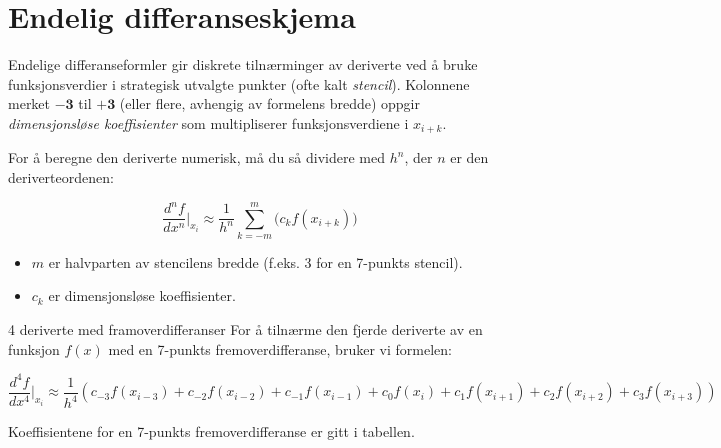 \section*{Endelig differanseskjema}

Endelige differanseformler gir diskrete tilnærminger av deriverte ved å bruke funksjonsverdier i strategisk utvalgte punkter (ofte kalt \emph{stencil}).
Kolonnene merket \(\mathbf{-3}\) til \(\mathbf{+3}\) (eller flere, avhengig av formelens bredde) oppgir \emph{dimensjonsløse koeffisienter} som multipliserer funksjonsverdiene i \(x_{i + k}\).

For å beregne den deriverte numerisk, må du så dividere med \(h^n\), der \(n\) er den deriverteordenen:

\[
    \frac{d^n f}{dx^n} \Bigg|_{x_i} \approx \frac{1}{h^n} \sum_{k=-m}^{m} \bigl( c_k f(x_{i+k}) \bigr)
\]

\begin{itemize}
    \item \(m\) er halvparten av stencilens bredde (f.eks. 3 for en 7-punkts stencil).
    \item \(c_k\) er dimensjonsløse koeffisienter.
\end{itemize}
\begin{example}{4 deriverte med framoverdifferanser}{}
    For å tilnærme den fjerde deriverte av en funksjon \(f(x)\) med en 7-punkts fremoverdifferanse, bruker vi formelen:

    \[
        \frac{d^4 f}{dx^4} \Bigg|_{x_i} \approx \frac{1}{h^4} \left( c_{-3} f(x_{i-3}) + c_{-2} f(x_{i-2}) + c_{-1} f(x_{i-1}) + c_0 f(x_i) + c_1 f(x_{i+1}) + c_2 f(x_{i+2}) + c_3 f(x_{i+3}) \right)
    \]

    Koeffisientene for en 7-punkts fremoverdifferanse er gitt i tabellen.
\end{example}

